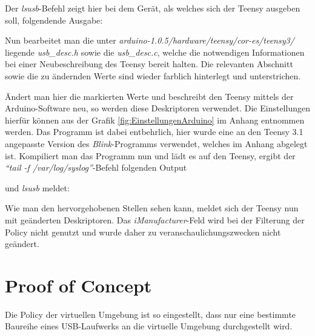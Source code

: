 

Der \textit{lsusb}-Befehl zeigt hier bei dem Gerät, als welches sich der Teensy ausgeben soll, folgendende Ausgabe:



Nun bearbeitet man die unter \textit{arduino-1.0.5/hardware/teensy/cor-es/teensy3/} liegende \textit{usb\_desc.h} sowie die \textit{usb\_desc.c}, welche die notwendigen Informationen bei einer Neubeschreibung des Teensy bereit halten. Die relevanten Abschnitt sowie die zu ändernden Werte sind wieder farblich hinterlegt und unterstrichen.





Ändert man hier die markierten Werte und beschreibt den Teensy mittels der Arduino-Software neu, so werden diese Deskriptoren verwendet. Die Einstellungen hierfür können aus der Grafik \ref{fig:EinstellungenArduino} im Anhang entnommen werden. Das Programm ist dabei entbehrlich, hier wurde eine an den Teensy 3.1 angepasste Version des \textit{Blink}-Programms verwendet, welches im Anhang abgelegt ist. Kompiliert man das Programm nun und lädt es auf den Teensy, ergibt der \textit{"`tail -f /var/log/syslog"'}-Befehl folgenden Output

\lstset{language=log}

und \textit{lsusb} meldet:


Wie man den hervorgehobenen Stellen sehen kann, meldet sich der Teensy nun mit geänderten Deskriptoren. Das \textit{iManufacturer}-Feld wird bei der Filterung der Policy nicht genutzt und wurde daher zu veranschaulichungszwecken nicht geändert.

\section{Proof of Concept} \label{PoC}
Die Policy der virtuellen Umgebung ist so eingestellt, dass nur eine  bestimmte Baureihe eines USB-Laufwerks an die virtuelle Umgebung durchgestellt wird.

